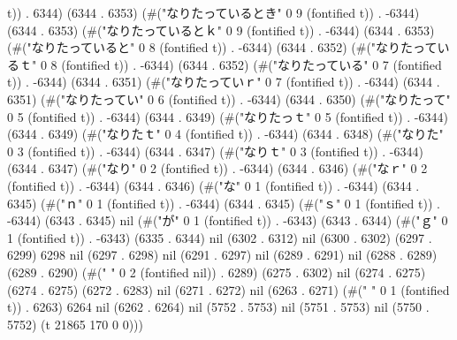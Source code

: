 t)) . 6344) (6344 . 6353) (#("なりたっているとき" 0 9 (fontified t)) . -6344) (6344 . 6353) (#("なりたっているとｋ" 0 9 (fontified t)) . -6344) (6344 . 6353) (#("なりたっていると" 0 8 (fontified t)) . -6344) (6344 . 6352) (#("なりたっているｔ" 0 8 (fontified t)) . -6344) (6344 . 6352) (#("なりたっている" 0 7 (fontified t)) . -6344) (6344 . 6351) (#("なりたっていｒ" 0 7 (fontified t)) . -6344) (6344 . 6351) (#("なりたってい" 0 6 (fontified t)) . -6344) (6344 . 6350) (#("なりたって" 0 5 (fontified t)) . -6344) (6344 . 6349) (#("なりたっｔ" 0 5 (fontified t)) . -6344) (6344 . 6349) (#("なりたｔ" 0 4 (fontified t)) . -6344) (6344 . 6348) (#("なりた" 0 3 (fontified t)) . -6344) (6344 . 6347) (#("なりｔ" 0 3 (fontified t)) . -6344) (6344 . 6347) (#("なり" 0 2 (fontified t)) . -6344) (6344 . 6346) (#("なｒ" 0 2 (fontified t)) . -6344) (6344 . 6346) (#("な" 0 1 (fontified t)) . -6344) (6344 . 6345) (#("ｎ" 0 1 (fontified t)) . -6344) (6344 . 6345) (#("ｓ" 0 1 (fontified t)) . -6344) (6343 . 6345) nil (#("が" 0 1 (fontified t)) . -6343) (6343 . 6344) (#("ｇ" 0 1 (fontified t)) . -6343) (6335 . 6344) nil (6302 . 6312) nil (6300 . 6302) (6297 . 6299) 6298 nil (6297 . 6298) nil (6291 . 6297) nil (6289 . 6291) nil (6288 . 6289) (6289 . 6290) (#("	 " 0 2 (fontified nil)) . 6289) (6275 . 6302) nil (6274 . 6275) (6274 . 6275) (6272 . 6283) nil (6271 . 6272) nil (6263 . 6271) (#(" " 0 1 (fontified t)) . 6263) 6264 nil (6262 . 6264) nil (5752 . 5753) nil (5751 . 5753) nil (5750 . 5752) (t 21865 170 0 0)))
